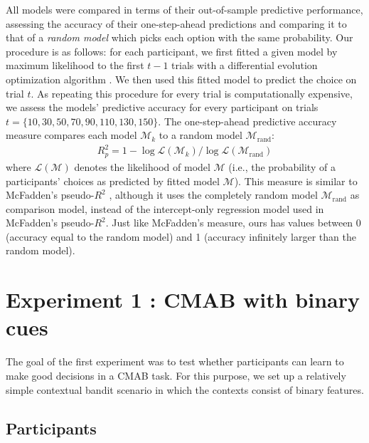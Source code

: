 \documentclass[a4paper,natbib]{apa6}
\begin{document}
All models were compared in terms of their out-of-sample predictive performance, assessing the accuracy of their one-step-ahead predictions and comparing it to that of a \emph{random model} which picks each option with the same probability. Our procedure is as follows: for each participant, we first fitted a given model by maximum likelihood to the first $t-1$ trials with a differential evolution optimization algorithm \citep[using 100 epochs, cf.][]{mullen2009deoptim}. We then used this fitted model to predict the choice on trial $t$. As repeating this procedure for every trial is computationally expensive, we assess the models' predictive accuracy for every participant on trials $t=\{10,30,50,70,90,110,130,150\}$. The one-step-ahead predictive accuracy measure compares each model $\mathcal{M}_k$ to a random model $\mathcal{M}_{\text{rand}}$:
\begin{align}
R^2_{p}=1 - \log\mathcal{L}(\mathcal{M}_k)/\log\mathcal{L}(\mathcal{M}_{\text{rand}})
\end{align}
where $\mathcal{L}(\mathcal{M})$ denotes the likelihood of model $\mathcal{M}$ (i.e., the probability of a participants' choices as predicted by fitted model $\mathcal{M}$). This measure is similar to McFadden's pseudo-$R^2$ \citep{mcfadden1973conditional}, although it uses the completely random model $\mathcal{M}_\text{rand}$ as comparison model, instead of the intercept-only regression model used in McFadden's pseudo-$R^2$. Just like McFadden's measure, ours has values between 0 (accuracy equal to the random model) and 1 (accuracy infinitely larger than the random model).


\section{Experiment 1 : CMAB with binary cues}

The goal of the first experiment was to test whether participants can learn to make good decisions in a CMAB task. For this purpose, we set up a relatively simple contextual bandit scenario in which the contexts consist of binary features.

\subsection{Participants}
\end{document}
